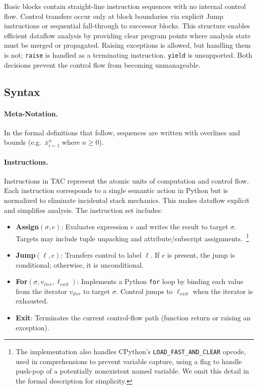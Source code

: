 Basic blocks contain straight-line instruction sequences with no internal control flow. Control transfers occur only at block boundaries via explicit \textsf{Jump} instructions or sequential fall-through to successor blocks. This structure enables efficient dataflow analysis by providing clear program points where analysis state must be merged or propagated.
Raising exceptions is allowed, but handling them is not; \texttt{raise} is handled as a terminating instruction. \texttt{yield} is unsupported. Both decisions prevent the control flow from becoming unmanageable. 

\subsection{Syntax}

\paragraph{Meta-Notation.}
In the formal definitions that follow, sequences are written with overlines and bounds (e.g.\ $\overline{x}_{i=1}^{n}$ where $n \geq 0$).

\paragraph{Instructions.}
Instructions in TAC represent the atomic units of computation and control flow.
Each instruction corresponds to a single semantic action in Python but is normalized
to eliminate incidental stack mechanics. This makes dataflow explicit and simplifies
analysis. The instruction set includes:
\begin{itemize}
    \item \textbf{\textsf{Assign}$(\sigma, e)$}: Evaluates expression $e$ and writes the result to target $\sigma$. Targets may include tuple unpacking and attribute/subscript assignments.~\footnote{The implementation also handles CPython's \texttt{LOAD\_FAST\_AND\_CLEAR} opcode, used in comprehensions to prevent variable capture, using a flag to handle push-pop of a potentially nonexistent named variable. We omit this detail in the formal description for simplicity.}
    \item \textbf{\textsf{Jump}$(\ell, e)$}: Transfers control to label $\ell$. If $e$ is present, the jump is conditional; otherwise, it is unconditional.
    \item \textbf{\textsf{For}$(\sigma, v_{\mathit{iter}}, \ell_{\mathit{exit}})$}: Implements a Python \texttt{for} loop by binding each value from the iterator $v_{\mathit{iter}}$ to target $\sigma$. Control jumps to $\ell_{\mathit{exit}}$ when the iterator is exhausted.
    \item \textbf{\textsf{Exit}}: Terminates the current control-flow path (function return or raising an exception).
\end{itemize}

